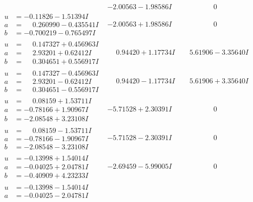 \documentclass[1p]{elsarticle_modified}
\theoremstyle{definition}
\begin{document}
$$\begin{array}{c|c|c}
 & -2.00563 - 1.98586 I & \phantom{-0.000000 } 0 \\ \hline\begin{aligned}
u &= -0.11826 - 1.51394 I \\
a &= \phantom{-}0.260990 - 0.435541 I \\
b &= -0.700219 - 0.765497 I\end{aligned}
 & -2.00563 + 1.98586 I & \phantom{-0.000000 } 0 \\ \hline\begin{aligned}
u &= \phantom{-}0.147327 + 0.456963 I \\
a &= \phantom{-}2.93201 + 0.62412 I \\
b &= \phantom{-}0.304651 + 0.556917 I\end{aligned}
 & \phantom{-}0.94420 + 1.17734 I & \phantom{-}5.61906 - 3.35640 I \\ \hline\begin{aligned}
u &= \phantom{-}0.147327 - 0.456963 I \\
a &= \phantom{-}2.93201 - 0.62412 I \\
b &= \phantom{-}0.304651 - 0.556917 I\end{aligned}
 & \phantom{-}0.94420 - 1.17734 I & \phantom{-}5.61906 + 3.35640 I \\ \hline\begin{aligned}
u &= \phantom{-}0.08159 + 1.53711 I \\
a &= -0.78166 + 1.90967 I \\
b &= -2.08548 + 3.23108 I\end{aligned}
 & -5.71528 + 2.30391 I & \phantom{-0.000000 } 0 \\ \hline\begin{aligned}
u &= \phantom{-}0.08159 - 1.53711 I \\
a &= -0.78166 - 1.90967 I \\
b &= -2.08548 - 3.23108 I\end{aligned}
 & -5.71528 - 2.30391 I & \phantom{-0.000000 } 0 \\ \hline\begin{aligned}
u &= -0.13998 + 1.54014 I \\
a &= -0.04025 + 2.04781 I \\
b &= -0.40909 + 4.23233 I\end{aligned}
 & -2.69459 - 5.99005 I & \phantom{-0.000000 } 0 \\ \hline\begin{aligned}
u &= -0.13998 - 1.54014 I \\
a &= -0.04025 - 2.04781 I \\

\end{aligned}
\end{array}$$
\end{document}
